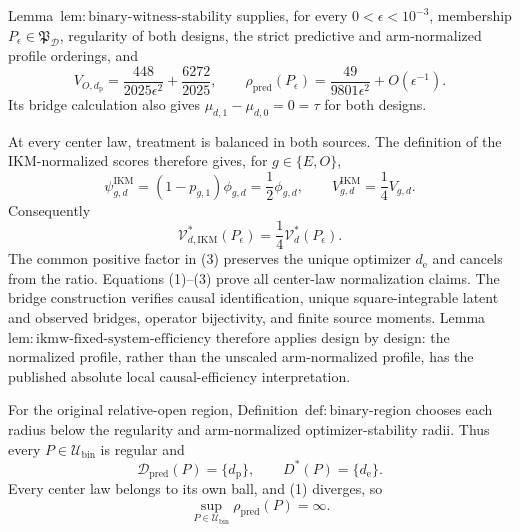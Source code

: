 Lemma~\(\mathrm{lem{:}binary\text{-}witness\text{-}stability}\) supplies, for every \(0<\epsilon<10^{-3}\), membership \(P_\epsilon\in\mathfrak P_{\mathcal D}\), regularity of both designs, the strict predictive and arm-normalized profile orderings, and
\[
 V_{O,d_{\mathrm p}}
 =\frac{448}{2025\epsilon^2}+\frac{6272}{2025},
 \qquad
 \rho_{\mathrm{pred}}(P_\epsilon)
 =\frac{49}{9801\epsilon^2}+O(\epsilon^{-1}).              \tag{1}
\]
Its bridge calculation also gives \(\mu_{d,1}-\mu_{d,0}=0=\tau\) for both designs.

At every center law, treatment is balanced in both sources.  The definition of the IKM-normalized scores therefore gives, for \(g\in\{E,O\}\),
\[
 \psi_{g,d}^{\mathrm{IKM}}
 =(1-p_{g,1})\phi_{g,d}=\frac12\phi_{g,d},
 \qquad
 V_{g,d}^{\mathrm{IKM}}=\frac14V_{g,d}.                    \tag{2}
\]
Consequently
\[
 \mathcal V_{d,\mathrm{IKM}}^*(P_\epsilon)
 =\frac14\mathcal V_d^*(P_\epsilon).                       \tag{3}
\]
The common positive factor in (3) preserves the unique optimizer \(d_{\mathrm e}\) and cancels from the ratio. Equations (1)--(3) prove all center-law normalization claims. The bridge construction verifies causal identification, unique square-integrable latent and observed bridges, operator bijectivity, and finite source moments. Lemma~\(\mathrm{lem{:}ikmw\text{-}fixed\text{-}system\text{-}efficiency}\) therefore applies design by design: the normalized profile, rather than the unscaled arm-normalized profile, has the published absolute local causal-efficiency interpretation.

For the original relative-open region, Definition~\(\mathrm{def{:}binary\text{-}region}\) chooses each radius below the regularity and arm-normalized optimizer-stability radii. Thus every \(P\in\mathcal U_{\mathrm{bin}}\) is regular and
\[
 \mathcal D_{\mathrm{pred}}(P)=\{d_{\mathrm p}\},
 \qquad
 D^*(P)=\{d_{\mathrm e}\}.
\]
Every center law belongs to its own ball, and (1) diverges, so
\[
 \sup_{P\in\mathcal U_{\mathrm{bin}}}\rho_{\mathrm{pred}}(P)=\infty.
                                                                    \tag{4}
\]

